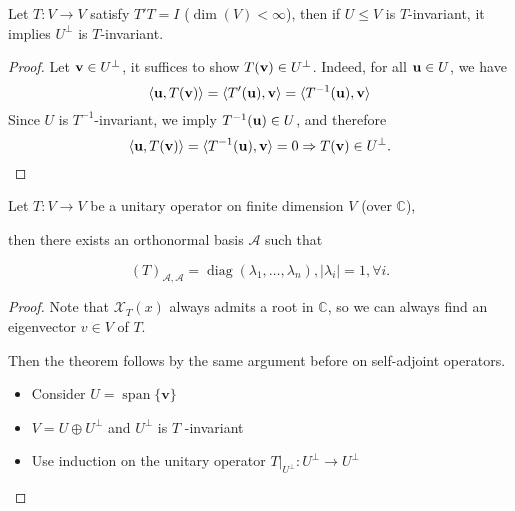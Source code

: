 \begin{proposition}
Let \( T : V \to V \) satisfy \( T'T = I \) (\( \dim(V) < \infty \)), then if \( U \leq V \) is \( T \)-invariant, it implies \( U^\perp \) is \( T \)-invariant.
\end{proposition}

\begin{proof}
Let \( {\bf v} \in U^\perp \), it suffices to show \( T({\bf v}) \in U^\perp \). Indeed, for all \({\bf  u} \in U \), we have
\[
\langle {\bf u}, T({\bf v}) \rangle = \langle T'({\bf u}), {\bf v} \rangle = \langle T^{-1}({\bf u}), {\bf v} \rangle
\]
Since \( U \) is \( T^{-1} \)-invariant, we imply \( T^{-1}({\bf u}) \in U \), and therefore
\[
\langle {\bf u}, T({\bf v}) \rangle = \langle T^{-1}({\bf u}), {\bf v} \rangle = 0 \Rightarrow T({\bf v}) \in U^\perp.
\]
\end{proof}

\begin{theorem} Let \(T : V \rightarrow  V\) be a unitary operator on finite dimension \(V\) (over \(\mathbb{C}\)),

then there exists an orthonormal basis \(\mathcal{A}\) such that

\[
{\left( T\right) }_{\mathcal{A},\mathcal{A}} = \operatorname{diag}\left( {{\lambda }_{1},\ldots ,{\lambda }_{n}}\right) ,\left| {\lambda }_{i}\right|  = 1,\forall i.
\]
\end{theorem}

\begin{proof} Note that \({\mathcal{X}}_{T}\left( x\right)\) always admits a root in \(\mathbb{C}\), so we can always find an eigenvector \(v \in  V\) of \(T\).

Then the theorem follows by the same argument before on self-adjoint operators.

\begin{itemize}
\item Consider \(U = \operatorname{span}\{ \mathbf{v}\}\)
\end{itemize}

\begin{itemize}
\item \(V = U \oplus  {U}^{ \bot  }\) and \({U}^{ \bot  }\) is \(T\) -invariant
\end{itemize}

\begin{itemize}
\item Use induction on the unitary operator \({\left. T\right| }_{{U}^{ \bot  }} : {U}^{ \bot  } \rightarrow  {U}^{ \bot  }\)
\end{itemize}
\end{proof}

